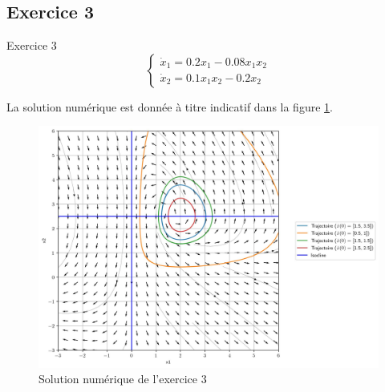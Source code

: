         \subsection{Exercice 3}
            \begin{exercise}{Exercice 3}
                \begin{equation}
                    \begin{cases}
                        \dot{x}_1 = 0.2 x_1 - 0.08 x_1 x_2 \\
                        \dot{x}_2 = 0.1 x_1 x_2 - 0.2 x_2
                    \end{cases}
                \end{equation}
            \end{exercise}
            La solution numérique est donnée à titre indicatif dans la figure \ref{fig:pdp_exercice_3_3}.
            \begin{figure}[ht!]
                \centering
                \includegraphics[width=\textwidth]{images/pdp_exercice_3_3.jpg}
                \caption{Solution numérique de l'exercice 3}
                \label{fig:pdp_exercice_3_3}
            \end{figure}

